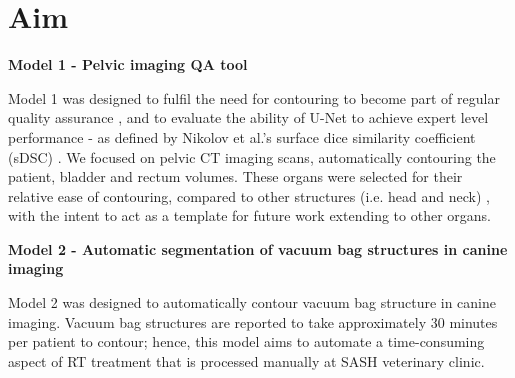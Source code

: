 \section{Aim}


\textbf{Model 1 - Pelvic imaging QA tool}

Model 1 was designed to fulfil the need for contouring to become part of regular quality assurance \cite{Vinod_2016}, and to evaluate the ability of U-Net to achieve expert level performance - as defined by Nikolov et al.'s surface dice similarity coefficient (sDSC) \cite{Nikolov_2018}. We focused on pelvic CT imaging scans, automatically contouring the patient, bladder and rectum volumes. These organs were selected for their relative ease of contouring, compared to other structures (i.e. head and neck) \cite{Wong2020}, with the intent to act as a template for future work extending to other organs.


\textbf{Model 2 - Automatic segmentation of vacuum bag structures in canine imaging}

Model 2 was designed to automatically contour vacuum bag structure in canine imaging. Vacuum bag structures are reported to take approximately 30 minutes per patient to contour; hence, this model aims to automate a time-consuming aspect of RT treatment that is processed manually at SASH veterinary clinic.


